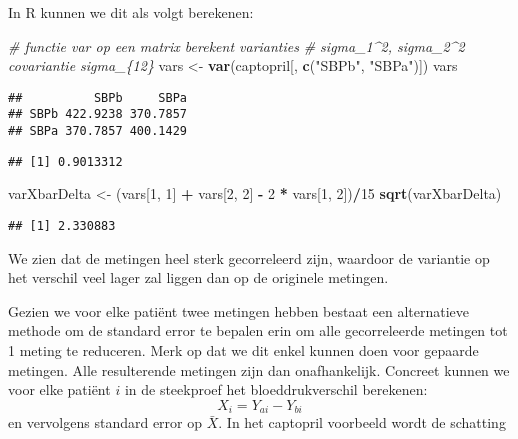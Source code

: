 \documentclass[
  12pt,dutch,coursenotes]{book}
\newenvironment{Shaded}{\begin{snugshade}}{\end{snugshade}}
\newcommand{\CommentTok}[1]{\textcolor[rgb]{0.56,0.35,0.01}{\textit{#1}}}
\newcommand{\DecValTok}[1]{\textcolor[rgb]{0.00,0.00,0.81}{#1}}
\newcommand{\KeywordTok}[1]{\textcolor[rgb]{0.13,0.29,0.53}{\textbf{#1}}}
\newcommand{\NormalTok}[1]{#1}
\newcommand{\OperatorTok}[1]{\textcolor[rgb]{0.81,0.36,0.00}{\textbf{#1}}}
\newcommand{\StringTok}[1]{\textcolor[rgb]{0.31,0.60,0.02}{#1}}
\theoremstyle{definition}
\theoremstyle{definition}
\theoremstyle{definition}
\theoremstyle{remark}
\begin{document}
In R kunnen we dit als volgt berekenen:

\begin{Shaded}
\begin{Highlighting}[]
\CommentTok{\# functie var op een matrix berekent varianties}
\CommentTok{\# sigma\_1\^{}2, sigma\_2\^{}2 covariantie sigma\_\{12\}}
\NormalTok{vars \textless{}{-}}\StringTok{ }\KeywordTok{var}\NormalTok{(captopril[, }\KeywordTok{c}\NormalTok{(}\StringTok{"SBPb"}\NormalTok{, }\StringTok{"SBPa"}\NormalTok{)])}
\NormalTok{vars}
\end{Highlighting}
\end{Shaded}

\begin{verbatim}
##          SBPb     SBPa
## SBPb 422.9238 370.7857
## SBPa 370.7857 400.1429
\end{verbatim}

\begin{Shaded}
\end{Shaded}

\begin{verbatim}
## [1] 0.9013312
\end{verbatim}

\begin{Shaded}
\begin{Highlighting}[]
\NormalTok{varXbarDelta \textless{}{-}}\StringTok{ }\NormalTok{(vars[}\DecValTok{1}\NormalTok{, }\DecValTok{1}\NormalTok{] }\OperatorTok{+}\StringTok{ }\NormalTok{vars[}\DecValTok{2}\NormalTok{, }\DecValTok{2}\NormalTok{] }\OperatorTok{{-}}\StringTok{ }\DecValTok{2} \OperatorTok{*}\StringTok{ }\NormalTok{vars[}\DecValTok{1}\NormalTok{, }
    \DecValTok{2}\NormalTok{])}\OperatorTok{/}\DecValTok{15}
\KeywordTok{sqrt}\NormalTok{(varXbarDelta)}
\end{Highlighting}
\end{Shaded}

\begin{verbatim}
## [1] 2.330883
\end{verbatim}

We zien dat de metingen heel sterk gecorreleerd zijn, waardoor de variantie op het verschil veel lager zal liggen dan op de originele metingen.

Gezien we voor elke patiënt twee metingen hebben bestaat een alternatieve methode om de standard error te bepalen erin om alle gecorreleerde metingen tot 1 meting te reduceren. Merk op dat we dit enkel kunnen doen voor gepaarde metingen. Alle resulterende metingen zijn dan onafhankelijk.
Concreet kunnen we voor elke patiënt \(i\) in de steekproef het bloeddrukverschil berekenen:
\[X_{i}=Y_{ai}-Y_{bi}\]
en vervolgens standard error op \(\bar X\).
In het captopril voorbeeld wordt de schatting
\end{document}
